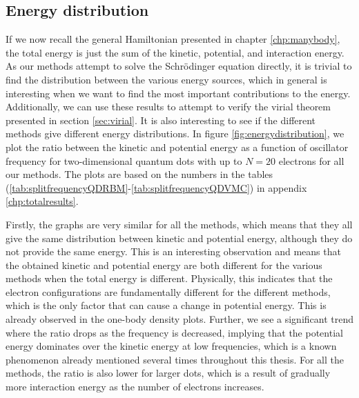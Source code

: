 \subsection{Energy distribution} \label{sec:energydistributions}
If we now recall the general Hamiltonian presented in chapter \ref{chp:manybody}, the total energy is just the sum of the kinetic, potential, and interaction energy. As our methods attempt to solve the Schrödinger equation directly, it is trivial to find the distribution between the various energy sources, which in general is interesting when we want to find the most important contributions to the energy. Additionally, we can use these results to attempt to verify the virial theorem presented in section \ref{sec:virial}. It is also interesting to see if the different methods give different energy distributions. In figure \eqref{fig:energydistribution}, we plot the ratio between the kinetic and potential energy as a function of oscillator frequency for two-dimensional quantum dots with up to $N=20$ electrons for all our methods. The plots are based on the numbers in the tables (\ref{tab:splitfrequencyQDRBM}-\ref{tab:splitfrequencyQDVMC}) in appendix \ref{chp:totalresults}. 



Firstly, the graphs are very similar for all the methods, which means that they all give the same distribution between kinetic and potential energy, although they do not provide the same energy. This is an interesting observation and means that the obtained kinetic and potential energy are both different for the various methods when the total energy is different. Physically, this indicates that the electron configurations are fundamentally different for the different methods, which is the only factor that can cause a change in potential energy. This is already observed in the one-body density plots. Further, we see a significant trend where the ratio drops as the frequency is decreased, implying that the potential energy dominates over the kinetic energy at low frequencies, which is a known phenomenon already mentioned several times throughout this thesis. For all the methods, the ratio is also lower for larger dots, which is a result of gradually more interaction energy as the number of electrons increases.

